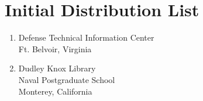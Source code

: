 \documentclass[twoside,thesis]{npsreport}
\begin{document}
\chapter*{Initial Distribution List}
\begin{enumerate}
\item Defense Technical Information Center\\Ft. Belvoir, Virginia
\item Dudley Knox Library\\Naval Postgraduate School\\Monterey, California

\end{enumerate}
\end{document}

